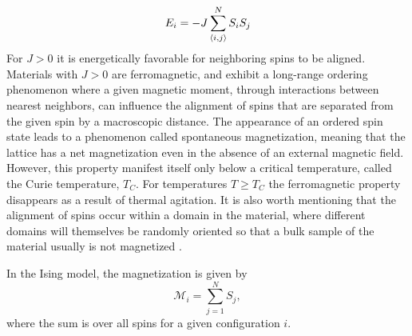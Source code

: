 \begin{equation}\label{eq:ising energy}
    E_i = - J \sum_{\ev{i,j}}^N S_i S_j
\end{equation}
For $J>0$ it is energetically favorable for neighboring spins to be aligned. Materials with $J>0$ are ferromagnetic, and exhibit a long-range ordering phenomenon where a given magnetic moment, through interactions between nearest neighbors, can influence the alignment of spins that are separated from the given spin by a macroscopic distance. The appearance of an ordered spin state leads to a phenomenon called spontaneous magnetization, meaning that the lattice has a net magnetization even in the absence of an external magnetic field. However, this property manifest itself only below a critical temperature, called the Curie temperature, $T_C$. For temperatures $T\geq T_C$ the ferromagnetic property disappears as a result of thermal agitation. It is also worth mentioning that the alignment of spins occur within a domain in the material, where different domains will themselves be randomly oriented so that a bulk sample of the material usually is not magnetized \cite[p. 421-422]{MHJ}\cite{HyperPhys}.

In the Ising model, the magnetization is given by \cite[p. 423]{MHJ}
\begin{equation}\label{eq:ising mag}
    \mathcal{M}_i = \sum_{j=1}^N S_j,
\end{equation}
where the sum is over all spins for a given configuration $i$.

